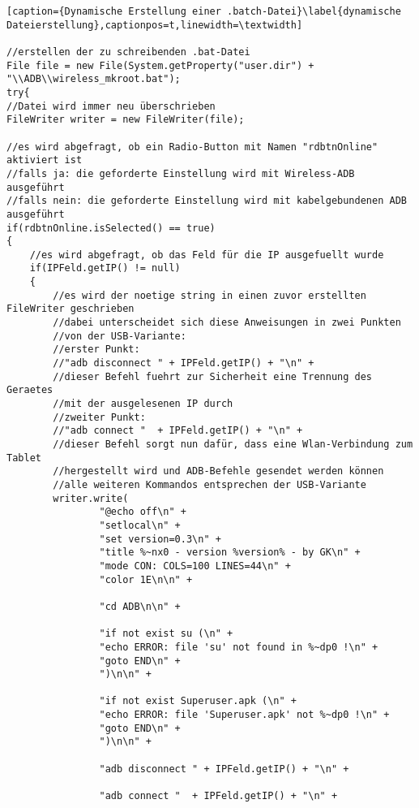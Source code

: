 \begin{flushleft}
\newpage
\begin{lstlisting}[caption={Dynamische Erstellung einer .batch-Datei}\label{dynamische Dateierstellung},captionpos=t,linewidth=\textwidth] 
 
//erstellen der zu schreibenden .bat-Datei
File file = new File(System.getProperty("user.dir") + "\\ADB\\wireless_mkroot.bat");
try{
//Datei wird immer neu überschrieben
FileWriter writer = new FileWriter(file);	

//es wird abgefragt, ob ein Radio-Button mit Namen "rdbtnOnline" aktiviert ist
//falls ja: die geforderte Einstellung wird mit Wireless-ADB ausgeführt
//falls nein: die geforderte Einstellung wird mit kabelgebundenen ADB ausgeführt
if(rdbtnOnline.isSelected() == true)
{
	//es wird abgefragt, ob das Feld für die IP ausgefuellt wurde
	if(IPFeld.getIP() != null)
	{
		//es wird der noetige string in einen zuvor erstellten FileWriter geschrieben
		//dabei unterscheidet sich diese Anweisungen in zwei Punkten
		//von der USB-Variante:
		//erster Punkt:
		//"adb disconnect " + IPFeld.getIP() + "\n" +
		//dieser Befehl fuehrt zur Sicherheit eine Trennung des Geraetes 
		//mit der ausgelesenen IP durch
		//zweiter Punkt:
		//"adb connect "  + IPFeld.getIP() + "\n" +
		//dieser Befehl sorgt nun dafür, dass eine Wlan-Verbindung zum Tablet
		//hergestellt wird und ADB-Befehle gesendet werden können 
		//alle weiteren Kommandos entsprechen der USB-Variante
		writer.write(
				"@echo off\n" +
				"setlocal\n" +
				"set version=0.3\n" +
				"title %~nx0 - version %version% - by GK\n" +
				"mode CON: COLS=100 LINES=44\n" +
				"color 1E\n\n" +
				
				"cd ADB\n\n" +
				
				"if not exist su (\n" +
				"echo ERROR: file 'su' not found in %~dp0 !\n" +
				"goto END\n" +
				")\n\n" +

				"if not exist Superuser.apk (\n" +
				"echo ERROR: file 'Superuser.apk' not %~dp0 !\n" +
				"goto END\n" +
				")\n\n" +
				  
				"adb disconnect " + IPFeld.getIP() + "\n" +
				
				"adb connect "  + IPFeld.getIP() + "\n" +
				

\end{lstlisting}
\end{flushleft}
